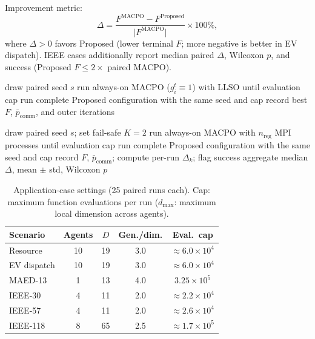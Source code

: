 Improvement metric:
\begin{equation}
\Delta=\frac{F^{\mathrm{MACPO}}-F^{\mathrm{Proposed}}}{\bigl|F^{\mathrm{MACPO}}\bigr|}\times 100\%,
\label{eq:app_delta}
\end{equation}
where $\Delta>0$ favors Proposed (lower terminal $F$; more negative is better in EV dispatch). IEEE cases additionally report median paired $\Delta$, Wilcoxon $p$, and success (Proposed $F\le 2\times$ paired MACPO).

\begin{algorithm}[H]
\caption{Paired application-case evaluation}
\label{alg:app_paired}
\begin{algorithmic}[1]
  \State draw paired seed $s$
  \State run always-on MACPO ($g_i^t\equiv 1$) with LLSO until evaluation cap
  \State run complete Proposed configuration with the same seed and cap
  \State record best $F$, $\bar p_{\mathrm{comm}}$, and outer iterations
\EndFor
\end{algorithmic}
\end{algorithm}

\begin{algorithm}[H]
\caption{Paired IEEE dispatch evaluation}
\label{alg:ieee_paired}
\begin{algorithmic}[1]
  \State draw paired seed $s$; set fail-safe $K{=}2$
  \State run always-on MACPO with $n_{\mathrm{reg}}$ MPI processes until evaluation cap
  \State run complete Proposed configuration with the same seed and cap
  \State record $F$, $\bar p_{\mathrm{comm}}$; compute per-run $\Delta_k$; flag success
\EndFor
\State aggregate median $\Delta$, mean $\pm$ std, Wilcoxon $p$
\end{algorithmic}
\end{algorithm}

\begin{table}[H]
\centering
\caption{Application-case settings (25 paired runs each). Cap: maximum function evaluations per run ($d_{\max}$: maximum local dimension across agents).}
\label{tab:application_setup}
\begin{tabular}{@{}lcccc@{}}
\toprule
\textbf{Scenario} & \textbf{Agents} & \textbf{$D$} & \textbf{Gen./dim.} & \textbf{Eval.\ cap} \\
\midrule
Resource & 10 & 19 & 3.0 & $\approx 6.0\times 10^4$ \\
EV dispatch & 10 & 19 & 3.0 & $\approx 6.0\times 10^4$ \\
MAED-13 & 1 & 13 & 4.0 & $3.25\times 10^5$ \\
IEEE-30 & 4 & 11 & 2.0 & $\approx 2.2\times 10^4$ \\
IEEE-57 & 4 & 11 & 2.0 & $\approx 2.6\times 10^4$ \\
IEEE-118 & 8 & 65 & 2.5 & $\approx 1.7\times 10^5$ \\
\bottomrule
\end{tabular}
\end{table}

